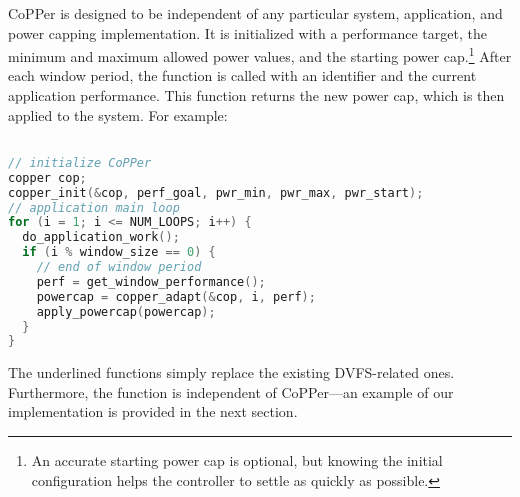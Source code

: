 CoPPer is designed to be independent of any particular system, application, and power capping implementation.
It is initialized with a performance target, the minimum and maximum allowed power values, and the starting power cap.\footnote{An accurate starting power cap is optional, but knowing the initial configuration helps the controller to settle as quickly as possible.}
After each window period, the  function is called with an identifier and the current application performance.
This function returns the new power cap, which is then applied to the system.
For example:

%
\begin{lstlisting}[language=C,%
  caption={Using CoPPer to compute and apply power caps.},%
  morekeywords={uint64_t, uint32_t, hbsc_ctx, raplcap, raplcap_limit, copper},%
  label={lst:example-copper}]%

// initialize CoPPer
copper cop;
copper_init(&cop, perf_goal, pwr_min, pwr_max, pwr_start);
// application main loop
for (i = 1; i <= NUM_LOOPS; i++) {
  do_application_work();
  if (i % window_size == 0) {
    // end of window period
    perf = get_window_performance();
    powercap = copper_adapt(&cop, i, perf);
    apply_powercap(powercap);
  }
}
\end{lstlisting}
The underlined functions simply replace the existing DVFS-related ones.
Furthermore, the  function is independent of CoPPer---an example of our implementation is provided in the next section.
